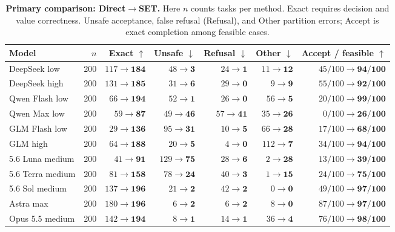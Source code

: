 \documentclass[11pt]{article}
\begin{document}
\begin{table}[!t]
\centering\small
\begin{tabular}{lrrrrrr}
\toprule
Model & $n$ & Exact $\uparrow$ & Unsafe $\downarrow$ & Refusal $\downarrow$ & Other $\downarrow$ & Accept / feasible $\uparrow$ \\
\midrule
DeepSeek low & 200 & $117\to\mathbf{184}$ & $48\to\mathbf{3}$ & $24\to\mathbf{1}$ & $11\to\mathbf{12}$ & $45/100\to\mathbf{94/100}$ \\
DeepSeek high & 200 & $131\to\mathbf{185}$ & $31\to\mathbf{6}$ & $29\to\mathbf{0}$ & $9\to\mathbf{9}$ & $55/100\to\mathbf{92/100}$ \\
Qwen Flash low & 200 & $66\to\mathbf{194}$ & $52\to\mathbf{1}$ & $26\to\mathbf{0}$ & $56\to\mathbf{5}$ & $20/100\to\mathbf{99/100}$ \\
Qwen Max low & 200 & $59\to\mathbf{87}$ & $49\to\mathbf{46}$ & $57\to\mathbf{41}$ & $35\to\mathbf{26}$ & $0/100\to\mathbf{26/100}$ \\
GLM Flash low & 200 & $29\to\mathbf{136}$ & $95\to\mathbf{31}$ & $10\to\mathbf{5}$ & $66\to\mathbf{28}$ & $17/100\to\mathbf{68/100}$ \\
GLM high & 200 & $64\to\mathbf{188}$ & $20\to\mathbf{5}$ & $4\to\mathbf{0}$ & $112\to\mathbf{7}$ & $34/100\to\mathbf{94/100}$ \\
5.6 Luna medium & 200 & $41\to\mathbf{91}$ & $129\to\mathbf{75}$ & $28\to\mathbf{6}$ & $2\to\mathbf{28}$ & $13/100\to\mathbf{39/100}$ \\
5.6 Terra medium & 200 & $81\to\mathbf{158}$ & $78\to\mathbf{24}$ & $40\to\mathbf{3}$ & $1\to\mathbf{15}$ & $24/100\to\mathbf{75/100}$ \\
5.6 Sol medium & 200 & $137\to\mathbf{196}$ & $21\to\mathbf{2}$ & $42\to\mathbf{2}$ & $0\to\mathbf{0}$ & $49/100\to\mathbf{97/100}$ \\
Astra max & 200 & $180\to\mathbf{196}$ & $6\to\mathbf{2}$ & $6\to\mathbf{2}$ & $8\to\mathbf{0}$ & $87/100\to\mathbf{97/100}$ \\
Opus 5.5 medium & 200 & $142\to\mathbf{194}$ & $8\to\mathbf{1}$ & $14\to\mathbf{1}$ & $36\to\mathbf{4}$ & $76/100\to\mathbf{98/100}$ \\
\bottomrule
\end{tabular}
\caption{\textbf{Primary comparison: Direct$\to$SET.} Here $n$ counts tasks per method. Exact requires decision and value correctness. Unsafe acceptance, false refusal (Refusal), and Other partition errors; Accept is exact completion among feasible cases.}
\label{tab:main}
\end{table}
\end{document}

